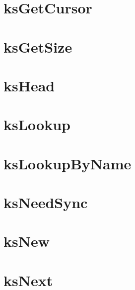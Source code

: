 \let\mypdfximage\pdfximage\def\pdfximage{\immediate\mypdfximage}\documentclass[twoside]{book}
\newcommand{\+}{\discretionary{\mbox{\scriptsize$\hookleftarrow$}}{}{}}
\begin{document}
\chapter{ks\+Get\+Cursor}
\label{doc_contrib_api_reviews_core_ksGetCursor_md}

\chapter{ks\+Get\+Size}
\label{doc_contrib_api_reviews_core_ksGetSize_md}

\chapter{ks\+Head}
\label{doc_contrib_api_reviews_core_ksHead_md}

\chapter{ks\+Lookup}
\label{doc_contrib_api_reviews_core_ksLookup_md}

\chapter{ks\+Lookup\+By\+Name}
\label{doc_contrib_api_reviews_core_ksLookupByName_md}

\chapter{ks\+Need\+Sync}
\label{doc_contrib_api_reviews_core_ksNeedSync_md}

\chapter{ks\+New}
\label{doc_contrib_api_reviews_core_ksNew_md}

\chapter{ks\+Next}
\label{doc_contrib_api_reviews_core_ksNext_md}

\end{document}
